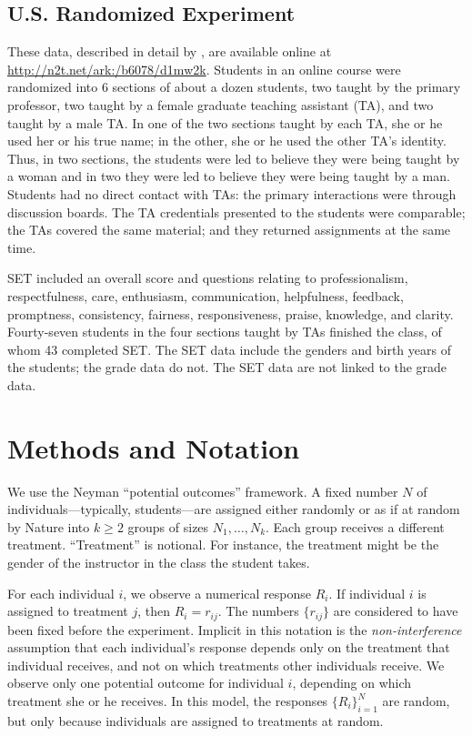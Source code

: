 \documentclass[12pt]{article}
\begin{document}
\subsection{U.S. Randomized Experiment}
These data, described in detail by \cite{MacNell2014}, are available online at 
\url{http://n2t.net/ark:/b6078/d1mw2k}.
Students in an online course were randomized into 6 sections of about a dozen students, 
two taught by the primary professor,
two taught by a female graduate teaching assistant (TA), and two taught by a male TA.
In one of the two sections taught by each TA, she or he used her or his
true name; in the other, she or he used the other TA's identity.
Thus, in two sections, the students were led to believe they were being taught by a woman
and in two they were led to believe they were being taught by a man.
Students had no direct contact with TAs: the primary interactions were through
discussion boards.
The TA credentials presented to the students were comparable; the TAs covered
the same material; and they returned assignments at the same time.

SET included an overall score and questions relating to
professionalism, respectfulness, care, enthusiasm, communication, helpfulness,
feedback, promptness, consistency, fairness, responsiveness, praise, knowledge, 
and clarity.
Fourty-seven students in the four sections taught by TAs finished the class,
of whom 43 completed SET.
The SET data include the genders and birth years of the students; the grade data do not.
The SET data are not linked to the grade data.

\section{Methods and Notation}
We use the Neyman ``potential outcomes'' framework.
A fixed number $N$ of individuals---typically, students---are assigned either
randomly or as if at random by Nature into 
$k \ge 2$ groups of sizes $N_1, \ldots, N_k$.
Each group receives a different treatment.
``Treatment'' is notional. 
For instance, the treatment might be the gender of the
instructor in the class the student takes.

For each individual $i$, we observe a numerical response $R_i$.
If individual $i$ is assigned to treatment $j$, then $R_i = r_{ij}$.
The numbers $\{r_{ij}\}$ are considered to have been fixed before the experiment.
Implicit in this notation is the \emph{non-interference} assumption that
each individual's response depends only on the treatment that individual receives, 
and not on which treatments other individuals receive.
We observe only one potential outcome for individual $i$, 
depending on which treatment she or he receives.
In this model, the responses $\{R_i\}_{i=1}^N$ are random, but only because individuals are 
assigned to treatments at random.
\end{document}
